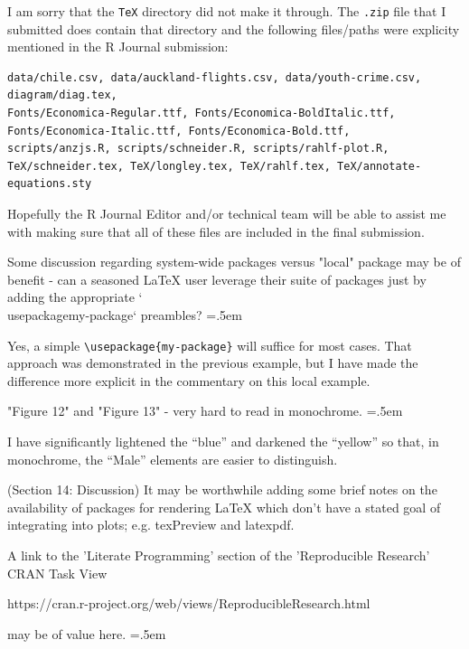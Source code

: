 \documentclass{article}
\newcommand{\code}[1]{\texttt{#1}}
\newenvironment{lcverbatim}
 {\SaveVerbatim{cverb}}
 {\endSaveVerbatim
  \flushleft\fboxrule=0pt\fboxsep=.5em
  \colorbox{cverbbg}{%
    \makebox[\dimexpr\linewidth-2\fboxsep][l]{\BUseVerbatim{cverb}}%
  }
  \endflushleft
}
\begin{document}
I am sorry that the \code{TeX} directory did not make it through.
The \code{.zip} file that I submitted does contain that directory
and the following files/paths were explicity mentioned in the R Journal
submission:

\begin{verbatim}
data/chile.csv, data/auckland-flights.csv, data/youth-crime.csv, diagram/diag.tex, 
Fonts/Economica-Regular.ttf, Fonts/Economica-BoldItalic.ttf, 
Fonts/Economica-Italic.ttf, Fonts/Economica-Bold.ttf, 
scripts/anzjs.R, scripts/schneider.R, scripts/rahlf-plot.R, 
TeX/schneider.tex, TeX/longley.tex, TeX/rahlf.tex, TeX/annotate-equations.sty
\end{verbatim}

Hopefully the R Journal Editor and/or technical team will be able to
assist me with making
sure that all of these files are included in the final submission.

\begin{lcverbatim}
  Some discussion regarding system-wide packages versus "local" package may be
  of benefit - can a seasoned LaTeX user leverage their suite of packages just 
  by adding the appropriate `\\usepackage{my-package}` preambles?
\end{lcverbatim}

Yes, a simple \verb|\usepackage{my-package}| will suffice for most
cases.  That approach was demonstrated in the previous example, but
I have made the difference more explicit in the commentary on this
local example.

\begin{lcverbatim}
  "Figure 12" and "Figure 13" - very hard to read in monochrome.
\end{lcverbatim}

I have significantly lightened the ``blue'' and darkened the ``yellow'' 
so that, in monochrome, the ``Male'' elements are easier to distinguish.

\begin{lcverbatim}
  (Section 14: Discussion)
  It may be worthwhile adding some brief notes on the availability of packages
  for rendering LaTeX which don't have a stated goal of integrating into plots;
  e.g. {texPreview} and {latexpdf}.

  A link to the 'Literate Programming' section of the 'Reproducible Research'
  CRAN Task View

  https://cran.r-project.org/web/views/ReproducibleResearch.html

  may be of value here.
\end{lcverbatim}
\end{document}
